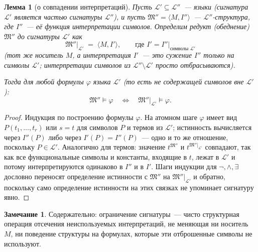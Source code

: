 \documentclass[12pt, a4paper]{article}
\theoremstyle{plain}
\newtheorem{lemma}[theorem]{Лемма}
\theoremstyle{definition}
\newtheorem{remark}[theorem]{Замечание}
\renewcommand{\models}{\vDash}
\newcommand{\Lang}{\mathcal{L}}
\newcommand{\Struct}{\mathfrak{M}}
\newcommand{\tuple}[1]{\langle #1 \rangle}
\begin{document}
\begin{lemma}[о совпадении интерпретаций]\label{lem:reduct}
Пусть $\Lang' \subseteq \Lang''$~--- языки (сигнатура $\Lang'$ является
частью сигнатуры $\Lang''$), и пусть
$\Struct'' = \tuple{M, I''}$~--- $\Lang''$-структура, где $I''$~---
её функция интерпретации символов. Определим
\emph{редукт} (обеднение) $\Struct''$ до сигнатуры $\Lang'$ как
\[
  \Struct''|_{\Lang'} \;=\; \tuple{M, I'},
  \qquad \text{где } I' = I''\big|_{\text{символы } \Lang'}
\]
(тот же носитель $M$, а интерпретация $I'$~--- это сужение $I''$ только
на символы $\Lang'$; интерпретации символов из $\Lang'' \setminus \Lang'$
просто отбрасываются).

Тогда для любой формулы $\varphi$ языка $\Lang'$ (то есть не содержащей
символов вне $\Lang'$):
\[
  \Struct'' \models \varphi
  \quad\iff\quad
  \Struct''|_{\Lang'} \models \varphi.
\]
\end{lemma}

\begin{proof}
Индукция по построению формулы $\varphi$. На атомном шаге $\varphi$ имеет
вид $P(t_1,\ldots,t_r)$ или $s=t$ для символов $P$ и термов из $\Lang'$;
истинность вычисляется через $I''(P)$ либо через $I'(P) = I''(P)$~---
одно и то же отношение, поскольку $P \in \Lang'$. Аналогично для термов:
значение $t^{\Struct''}$ и $t^{\Struct''|_{\Lang'}}$ совпадают, так как
все функциональные символы и константы, входящие в $t$, лежат в $\Lang'$
и потому интерпретируются одинаково в $I''$ и в $I'$. Шаги индукции для
$\neg, \wedge, \exists$ дословно переносят определение истинности с
$\Struct''$ на $\Struct''|_{\Lang'}$ и обратно, поскольку само
определение истинности на этих связках не упоминает сигнатуру явно.
\end{proof}

\begin{remark}
Содержательно: ограничение сигнатуры~--- чисто структурная операция
отсечения неиспользуемых интерпретаций, не меняющая ни носитель $M$,
ни поведение структуры на формулах, которые эти отброшенные символы
не используют.
\end{remark}
\end{document}
